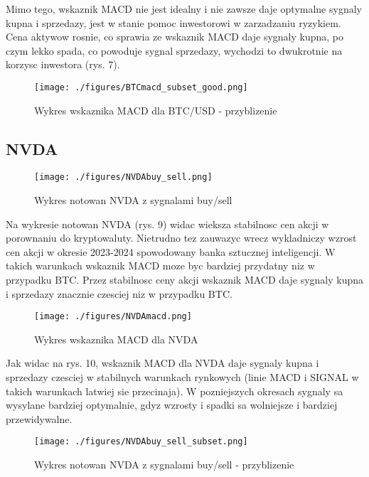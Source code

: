 \documentclass[a4paper,12pt]{article}  %
\begin{document}
Mimo tego, wskaznik MACD nie jest idealny i nie zawsze daje optymalne sygnaly
kupna i sprzedazy, jest w stanie pomoc inwestorowi w zarzadzaniu ryzykiem.
Cena aktywow rosnie, co sprawia ze wskaznik MACD daje sygnaly kupna, po czym
lekko spada, co powoduje sygnal sprzedazy, wychodzi to dwukrotnie na korzysc
inwestora (rys. 7).

\begin{figure}[H]
  \centering
  \texttt{[image: ./figures/BTCmacd\_subset\_good.png]}
  \caption{Wykres wskaznika MACD dla BTC/USD - przyblizenie}
\end{figure}

\pagebreak

\subsection{NVDA}

\begin{figure}[H]
  \centering
  \texttt{[image: ./figures/NVDAbuy\_sell.png]}
  \caption{Wykres notowan NVDA z sygnalami buy/sell}
\end{figure}

Na wykresie notowan NVDA (rys. 9) widac wieksza stabilnosc cen akcji w
porownaniu do kryptowaluty. Nietrudno tez zauwazyc wrecz wykladniczy wzrost
cen akcji w okresie 2023-2024 spowodowany banka sztucznej inteligencji. 
W takich warunkach wskaznik MACD moze byc bardziej przydatny niz w przypadku
BTC. Przez stabilnosc ceny akcji wskaznik MACD daje sygnaly kupna i sprzedazy
znacznie czesciej niz w przypadku BTC.

\begin{figure}[H]
  \centering
  \texttt{[image: ./figures/NVDAmacd.png]}
  \caption{Wykres wskaznika MACD dla NVDA}
\end{figure}

\pagebreak

Jak widac na rys. 10, wskaznik MACD dla NVDA daje sygnaly kupna i sprzedazy
czesciej w stabilnych warunkach rynkowych (linie MACD i SIGNAL w takich
warunkach latwiej sie przecinaja). W pozniejszych okresach sygnaly sa wysylane 
bardziej optymalnie, gdyz wzrosty i spadki sa wolniejsze i bardziej
przewidywalne. 

\begin{figure}[H]
  \centering
  \texttt{[image: ./figures/NVDAbuy\_sell\_subset.png]}
  \caption{Wykres notowan NVDA z sygnalami buy/sell - przyblizenie}
\end{figure}
\end{document}
